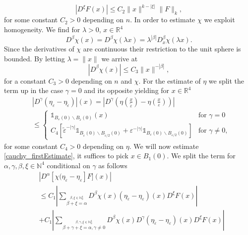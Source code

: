 \documentclass[oneside,reqno,12pt]{amsart}
\begin{document}
\begin{equation}\label{CauchyEstimate1}
|D^\xi F(x)| \le C_2 \|x\|^{k-|\xi|} \|F\|_k,
\end{equation}
for some constant \(C_2>0\) depending on \(n\).
In order to estimate \(\chi\) we exploit homogeneity. We find for \(\lambda>0\), \(x\in\mathbb{R}^4\)
\begin{equation*}
D^\beta \chi(x)=D^\beta \chi(\lambda x) = \lambda^{|\beta|} D^\beta_x \chi(\lambda x).
\end{equation*}
Since the derivatives of \(\chi\) are continuous their restriction to the unit sphere is bounded. By letting \(\lambda = \|x\|\) we arrive at
\begin{equation}\label{CauchyEstimate2}
\left| D^\beta \chi (x)\right| \le C_3 \|x\|^{-|\beta|},
\end{equation}
for a constant \(C_3>0\) depending on \(n\) and \(\chi\). For the estimate of \(\eta\) we split the term up in the case \(\gamma=0\) and its opposite yielding for \(x\in\mathbb{R}^4\)
\begin{align}\tag*{}
&\left|D^\gamma (\eta_{\varepsilon}-\eta_{\tilde{\varepsilon}})\right| (x)= 
\left|D^\gamma \left(\eta \left(\frac{x}{\tilde{\varepsilon}}\right)- \eta \left(\frac{x}{\varepsilon}\right)\right)\right|\\ \label{CauchyEstimate3}
&\le \left\{ \begin{matrix}
\mathds{1}_{B_\varepsilon(0)\backslash B_{\tilde{\varepsilon}}(0)}(x) \quad &\text{for }\gamma=0\\
C_4 [\tilde{\varepsilon}^{-|\gamma|} \mathds{1}_{B_{\tilde{\varepsilon}}(0)\backslash B_{\tilde{\varepsilon}/2}(0)}
+\varepsilon^{-|\gamma|} \mathds{1}_{B_{\varepsilon}(0)\backslash B_{\varepsilon/2}(0)}] &\text{for } \gamma \neq 0,
\end{matrix}  \right.
\end{align}
for some constant \(C_4>0\) depending on \(\eta\). We will now estimate \eqref{cauchy_firstEstimate}, it suffices to pick \(x\in B_1(0)\). We split the term for \(\alpha,\gamma,\beta,\xi \in\mathbb{N}^4\) conditional on \(\gamma\) as follows
\begin{align}\tag*{}
&\left| D^\alpha [\chi (\eta_{\tilde{\varepsilon}}-\eta_\varepsilon]F](x)\right|\\ \label{cauchy_A} \tag{A}
&\le C_1 \left| \sum_{\stackrel{\beta,\xi\in\mathbb{N}_0^4}{\beta+\xi = \alpha}} D^\beta \chi (x) (\eta_{\tilde{\varepsilon}}-\eta_{\varepsilon})(x) D^\xi F(x)\right|\\ \label{cauchy_B} \tag{B}
&+ C_1 \left| \sum_{\stackrel{\beta,\gamma, \xi\in\mathbb{N}_0^4}{\beta+\gamma+\xi = \alpha,\gamma\neq 0}} D^\beta \chi (x) D^\gamma (\eta_{\tilde{\varepsilon}}-\eta_{\varepsilon})(x) D^\xi F(x)\right|
\end{align}
\end{document}
